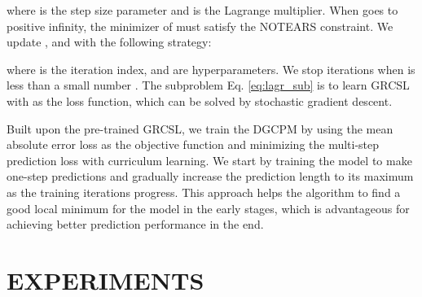 \documentclass[letterpaper, 10 pt, conference]{ieeeconf}
\begin{document}
where  is the step size parameter and  is the Lagrange multiplier. When  goes to positive infinity, the minimizer of  must satisfy the NOTEARS constraint. We update ,  and  with the following strategy:

where  is the iteration index,  and  are hyperparameters. We stop iterations when  is less than a small number . The subproblem Eq. \eqref{eq:lagr_sub} is to learn GRCSL with  as the loss function, which can be solved by stochastic gradient descent.

Built upon the pre-trained GRCSL, we train the DGCPM by using the mean absolute error loss as the objective function and minimizing the multi-step prediction loss with curriculum learning. We start by training the model to make one-step predictions and gradually increase the prediction length to its maximum  as the training iterations progress. This approach helps the algorithm to find a good local minimum for the model in the early stages, which is advantageous for achieving better prediction performance in the end.

\section{EXPERIMENTS}
\end{document}
